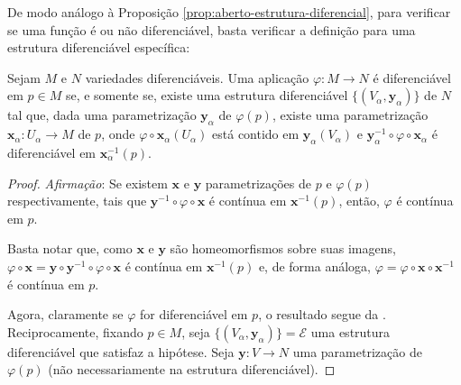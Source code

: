 	De modo análogo à Proposição \ref{prop:aberto-estrutura-diferencial}, para verificar se uma função é ou não diferenciável, basta verificar a definição para uma estrutura diferenciável específica:
	\begin{proposition}
		\label{prop:diferenciabilidade-estrutura-diferencial}
		Sejam $M$ e $N$ variedades diferenciáveis. Uma aplicação $\varphi:M\to N$ é diferenciável em $p \in M$ se, e somente se, existe uma estrutura diferenciável $\{ (V_{\alpha}, \mathbf{y}_{\alpha}) \}$ de $N$ tal que, dada uma parametrização $\mathbf{y}_{\alpha}$ de $\varphi(p)$, existe uma parametrização $\mathbf{x}_{\alpha}:U_{\alpha}\to M$ de $p$, onde $\varphi \circ \mathbf{x}_{\alpha}(U_{\alpha})$ está contido em $\mathbf{y}_{\alpha}(V_{\alpha})$ e $\mathbf{y}_{\alpha}^{-1} \circ\varphi \circ \mathbf{x}_{\alpha}$ é diferenciável em $\mathbf{x}_{\alpha}^{-1}(p)$.
		\begin{proof}

			\emph{Afirmação}: Se existem $\mathbf{x}$ e $\mathbf{y}$ parametrizações de $p$ e $\varphi(p)$ respectivamente, tais que $\mathbf{y}^{-1} \circ \varphi \circ \mathbf{x}$ é contínua em $\mathbf{x}^{-1}(p)$, então, $\varphi$ é contínua em $p$.

			Basta notar que, como $\mathbf{x}$ e $\mathbf{y}$ são homeomorfismos sobre suas imagens, $\varphi \circ \mathbf{x}=\mathbf{y}\circ \mathbf{y}^{-1} \circ \varphi \circ \mathbf{x}$ é contínua em $\mathbf{x}^{-1}(p)$ e, de forma análoga, $\varphi=\varphi \circ \mathbf{x} \circ \mathbf{x}^{-1}$ é contínua em $p$.

			Agora, claramente se $\varphi$ for diferenciável em $p$, o resultado segue da . Reciprocamente, fixando $p \in M$, seja $\{ (V_{\alpha}, \mathbf{y}_{\alpha}) \}= \mathcal{E}$ uma estrutura diferenciável que satisfaz a hipótese. Seja $\mathbf{y}:V\to N$ uma parametrização  de $\varphi(p)$ (não necessariamente na estrutura diferenciável).


\end{proof}
\end{proposition}
